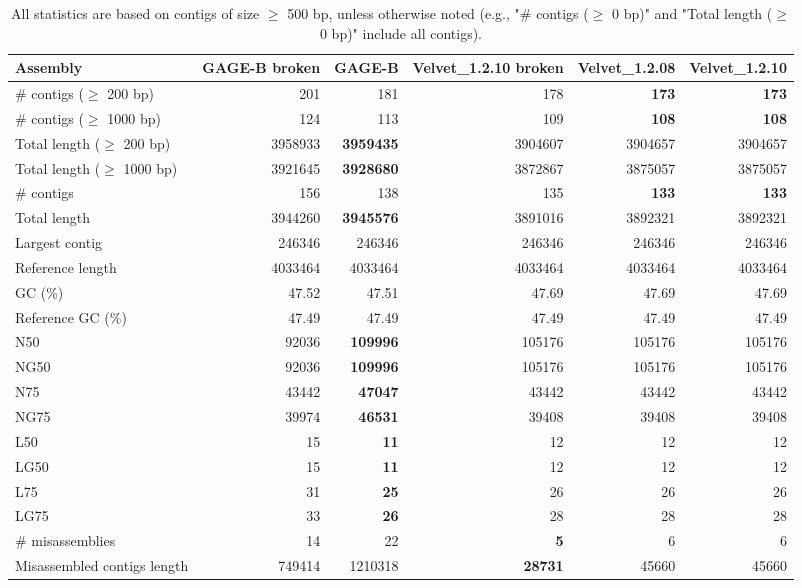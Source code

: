 \documentclass[12pt,a4paper]{article}
\begin{document}
\begin{table}[ht]
\begin{center}
\caption{All statistics are based on contigs of size $\geq$ 500 bp, unless otherwise noted (e.g., "\# contigs ($\geq$ 0 bp)" and "Total length ($\geq$ 0 bp)" include all contigs).}
\begin{tabular}{|l*{5}{|r}|}
\hline
Assembly & GAGE-B broken & GAGE-B & Velvet\_1.2.10 broken & Velvet\_1.2.08 & Velvet\_1.2.10 \\ \hline
\# contigs ($\geq$ 200 bp) & 201 & 181 & 178 & {\bf 173} & {\bf 173} \\ \hline
\# contigs ($\geq$ 1000 bp) & 124 & 113 & 109 & {\bf 108} & {\bf 108} \\ \hline
Total length ($\geq$ 200 bp) & 3958933 & {\bf 3959435} & 3904607 & 3904657 & 3904657 \\ \hline
Total length ($\geq$ 1000 bp) & 3921645 & {\bf 3928680} & 3872867 & 3875057 & 3875057 \\ \hline
\# contigs & 156 & 138 & 135 & {\bf 133} & {\bf 133} \\ \hline
Total length & 3944260 & {\bf 3945576} & 3891016 & 3892321 & 3892321 \\ \hline
Largest contig & 246346 & 246346 & 246346 & 246346 & 246346 \\ \hline
Reference length & 4033464 & 4033464 & 4033464 & 4033464 & 4033464 \\ \hline
GC (\%) & 47.52 & 47.51 & 47.69 & 47.69 & 47.69 \\ \hline
Reference GC (\%) & 47.49 & 47.49 & 47.49 & 47.49 & 47.49 \\ \hline
N50 & 92036 & {\bf 109996} & 105176 & 105176 & 105176 \\ \hline
NG50 & 92036 & {\bf 109996} & 105176 & 105176 & 105176 \\ \hline
N75 & 43442 & {\bf 47047} & 43442 & 43442 & 43442 \\ \hline
NG75 & 39974 & {\bf 46531} & 39408 & 39408 & 39408 \\ \hline
L50 & 15 & {\bf 11} & 12 & 12 & 12 \\ \hline
LG50 & 15 & {\bf 11} & 12 & 12 & 12 \\ \hline
L75 & 31 & {\bf 25} & 26 & 26 & 26 \\ \hline
LG75 & 33 & {\bf 26} & 28 & 28 & 28 \\ \hline
\# misassemblies & 14 & 22 & {\bf 5} & 6 & 6 \\ \hline
Misassembled contigs length & 749414 & 1210318 & {\bf 28731} & 45660 & 45660 \\ \hline

\end{tabular}
\end{center}
\end{table}
\end{document}

